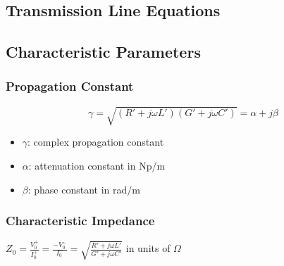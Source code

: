 \documentclass[a4paper]{article}
\begin{document}
\subsection{Transmission Line Equations}
\begin{center}
\end{center}

\subsection{Characteristic Parameters}
\subsubsection{Propagation Constant}
$$\gamma = \sqrt{(R'+j\omega L')(G'+j\omega C')} = \alpha + j\beta$$
\begin{itemize}
    \item $\gamma$: complex propagation constant
    \item $\alpha$: attenuation constant in Np/m
    \item $\beta$: phase constant in rad/m
\end{itemize}

\subsubsection{Characteristic Impedance}
\begin{center}
    $Z_0 = \displaystyle\frac{V_0^+}{I_0^+} = \displaystyle\frac{-V_0^-}{I_0^-} = \sqrt{\displaystyle\frac{R'+j\omega L'}{G'+j\omega C'}}$ in units of $\Omega$
\end{center}
\end{document}
